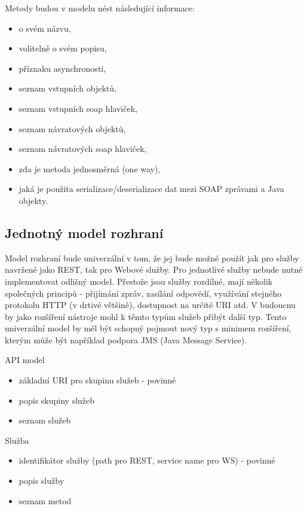 \documentclass[11pt,twoside,a4paper]{book}
\begin{document}
Metody budou v modelu nést následující informace:

\begin{itemize}
  \item o svém názvu,
  \item volitelně o svém popisu,
  \item příznaku asynchronosti,
  \item seznam vstupních objektů,
  \item seznam vstupních soap hlaviček,
  \item seznam návratových objektů,
  \item seznam návratových soap hlaviček,
  \item zda je metoda jednosměrná (one way),
  \item jaká je použita serializace/deserializace dat mezi SOAP zprávami a Java objekty.
\end{itemize}

\subsection{Jednotný model rozhraní}

Model rozhraní bude univerzální v tom, že jej bude možné použít jak pro služby navržené
jako REST, tak pro Webové služby. Pro jednotlivé služby nebude nutné implementovat
odlišný model. Přestože jsou služby rozdílné, mají několik společných principů - přijímání
zpráv, zasílání odpovědí, využívání stejného protokolu HTTP (v drtivé většině), dostupnost na
určité URI atd. V budoucnu by jako rozšíření nástroje mohl k těmto typům služeb přibýt další
typ. Tento univerzální model by měl být schopný pojmout nový typ s minimem rozšíření,
kterým může být například podpora JMS (Java Message Service).

API model

\begin{itemize}
  \item základní URI pro skupinu služeb - povinné
  \item popis skupiny služeb
  \item seznam služeb
\end{itemize}

Služba

\begin{itemize}
  \item identifikátor služby (path pro REST, service name pro WS) - povinné
  \item popis služby
  \item seznam metod
\end{itemize}
\end{document}
